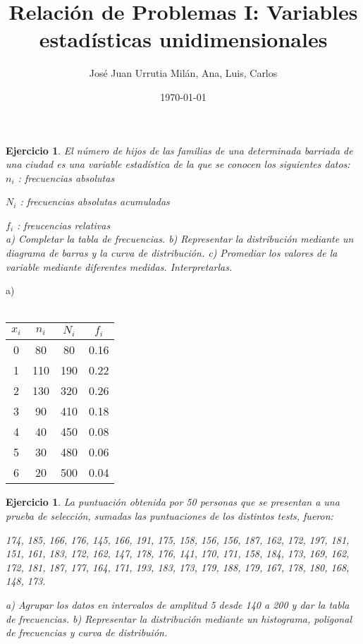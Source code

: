 \documentclass{article}
\title{Relación de Problemas I: Variables estadísticas unidimensionales}
\author{José Juan Urrutia Milán, Ana, Luis, Carlos}
\date{\today}
\begin{document}
\maketitle

\newtheorem{ej1}{Ejercicio}
\begin{ej1}
    El número de hijos de las familias de una determinada barriada de una ciudad
    es una variable estadística de la que se conocen los siguientes datos:\\

    $n_i$ : frecuencias absolutas \par
    $N_i$ : frecuencias absolutas acumuladas \par
    $f_i$ : freucencias relativas \\

    \noindent
    a) Completar la tabla de frecuencias.\newline
    b) Representar la distribución mediante un diagrama de barras y la curva de
    distribución.\newline
    c) Promediar los valores de la variable mediante diferentes medidas. Interpretarlas.

\end{ej1}

\bigskip \noindent
a) \\ \\
\begin{tabular}{|c|c|c|c|}
    $x_i$ & $n_i$ & $N_i$ & $f_i$ \\
    \hline
    0     & 80    & 80    & 0.16  \\
    \hline
    1     & 110   & 190   & 0.22  \\
    \hline
    2     & 130   & 320   & 0.26  \\
    \hline
    3     & 90    & 410   & 0.18  \\
    \hline
    4     & 40    & 450   & 0.08  \\
    \hline
    5     & 30    & 480   & 0.06  \\
    \hline
    6     & 20    & 500   & 0.04  \\
    \hline
\end{tabular}

\bigskip
\newtheorem{ej2}{Ejercicio}
\begin{ej2}
    La puntuación obtenida por 50 personas que se presentan a una prueba de selección,
    sumadas las puntuaciones de los distintos tests, fueron:

    \begin{center}
        174, 185, 166, 176, 145, 166, 191, 175, 158, 156, 156, 187, 162, 172,
        197, 181, 151, 161, 183, 172, 162, 147, 178, 176, 141, 170, 171, 158,
        184, 173, 169, 162, 172, 181, 187, 177, 164, 171, 193, 183, 173, 179,
        188, 179, 167, 178, 180, 168, 148, 173.
    \end{center}

    \noindent
    a) Agrupar los datos en intervalos de amplitud 5 desde 140 a 200 y dar la tabla de
    frecuencias.\newline
    b) Representar la distribución mediante un histograma, poligonal de frecuencias
    y curva de distribuión.
\end{ej2}
\end{document}
